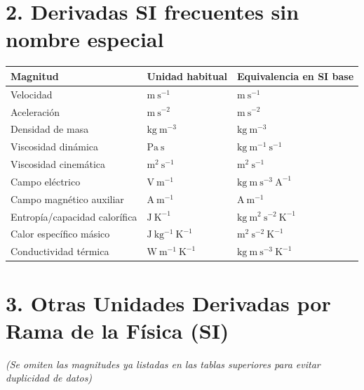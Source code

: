 \documentclass[11pt,a4paper]{article}
\begin{document}
\section*{2. Derivadas SI frecuentes sin nombre especial}

\scriptsize
\begin{tabularx}{\linewidth}{>{\raggedright\arraybackslash}X>{\raggedright\arraybackslash}X>{\raggedright\arraybackslash}X}
\hline
Magnitud & Unidad habitual & Equivalencia en SI base \\
\hline
Velocidad & $\mathrm{m\ s^{-1}}$ & $\mathrm{m\ s^{-1}}$ \\
\hline
Aceleración & $\mathrm{m\ s^{-2}}$ & $\mathrm{m\ s^{-2}}$ \\
\hline
Densidad de masa & $\mathrm{kg\ m^{-3}}$ & $\mathrm{kg\ m^{-3}}$ \\
\hline
Viscosidad dinámica & $\mathrm{Pa\ s}$ & $\mathrm{kg\ m^{-1}\ s^{-1}}$ \\
\hline
Viscosidad cinemática & $\mathrm{m^2\ s^{-1}}$ & $\mathrm{m^2\ s^{-1}}$ \\
\hline
Campo eléctrico & $\mathrm{V\ m^{-1}}$ & $\mathrm{kg\ m\ s^{-3}\ A^{-1}}$ \\
\hline
Campo magnético auxiliar & $\mathrm{A\ m^{-1}}$ & $\mathrm{A\ m^{-1}}$ \\
\hline
Entropía/capacidad calorífica & $\mathrm{J\ K^{-1}}$ & $\mathrm{kg\ m^2\ s^{-2}\ K^{-1}}$ \\
\hline
Calor específico másico & $\mathrm{J\ kg^{-1}\ K^{-1}}$ & $\mathrm{m^2\ s^{-2}\ K^{-1}}$ \\
\hline
Conductividad térmica & $\mathrm{W\ m^{-1}\ K^{-1}}$ & $\mathrm{kg\ m\ s^{-3}\ K^{-1}}$ \\
\hline
\end{tabularx}
\normalsize

\section*{3. Otras Unidades Derivadas por Rama de la Física (SI)}

\textit{(Se omiten las magnitudes ya listadas en las tablas superiores para evitar duplicidad de datos)}
\end{document}
